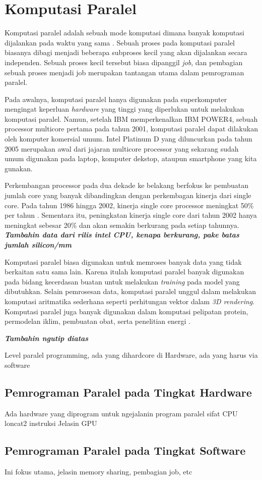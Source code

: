 \section{Komputasi Paralel}
Komputasi paralel adalah sebuah mode komputasi dimana banyak komputasi dijalankan pada waktu yang sama \citep{highly_parallel_computing}. Sebuah proses pada komputasi paralel biasanya dibagi menjadi beberapa subproses kecil yang akan dijalankan secara independen. Sebuah proses kecil tersebut biasa dipanggil \textit{job}, dan pembagian sebuah proses menjadi job merupakan tantangan utama dalam pemrograman paralel.

Pada awalnya, komputasi paralel hanya digunakan pada superkomputer mengingat keperluan \textit{hardware} yang tinggi yang diperlukan untuk melakukan komputasi paralel. Namun, setelah IBM memperkenalkan IBM POWER4, sebuah processor multicore pertama pada tahun 2001, komputasi paralel dapat dilakukan oleh komputer komersial umum. Intel Platinum D yang diluncurkan pada tahun 2005 merupakan awal dari jajaran multicore processor yang sekarang sudah umum digunakan pada laptop, komputer dekstop, ataupun smartphone yang kita gunakan.

Perkembangan processor pada dua dekade ke belakang berfokus ke pembuatan jumlah core yang banyak dibandingkan dengan perkembagan kinerja dari single core. Pada tahun 1986 hingga 2002, kinerja single core processor meningkat 50\% per tahun \citep{comp_arch_patterson}. Sementara itu, peningkatan kinerja single core dari tahun 2002 hanya meningkat sebesar 20\% \citep{intro_parallel} dan akan semakin berkurang pada setiap tahunnya. \textit{\textbf{Tambahin data dari rilis intel CPU, kenapa berkurang,  pake batas jumlah silicon/mm}}

Komputasi paralel biasa digunakan untuk memroses banyak data yang tidak berkaitan satu sama lain. Karena itulah komputasi paralel banyak digunakan pada bidang kecerdasan buatan untuk melakukan \textit{training} pada model yang dibutuhkan. Selain pemrosesan data, komputasi paralel unggul dalam melakukan komputasi aritmatika sederhana seperti perhitungan vektor dalam \textit{3D rendering}. Komputasi paralel juga banyak digunakan dalam komputasi pelipatan protein, permodelan iklim, pembuatan obat, serta penelitian energi \citep{intro_parallel}.

\textit{\textbf{Tambahin ngutip diatas}}

Level paralel programming, ada yang dihardcore di Hardware, ada yang harus via software
\subsection{Pemrograman Paralel pada Tingkat Hardware}
Ada hardware yang diprogram untuk ngejalanin program paralel
sifat CPU loncat2 instruksi
Jelasin GPU
\subsection{Pemrograman Paralel pada Tingkat Software}
Ini fokus utama, jelasin memory sharing, pembagian job, etc
